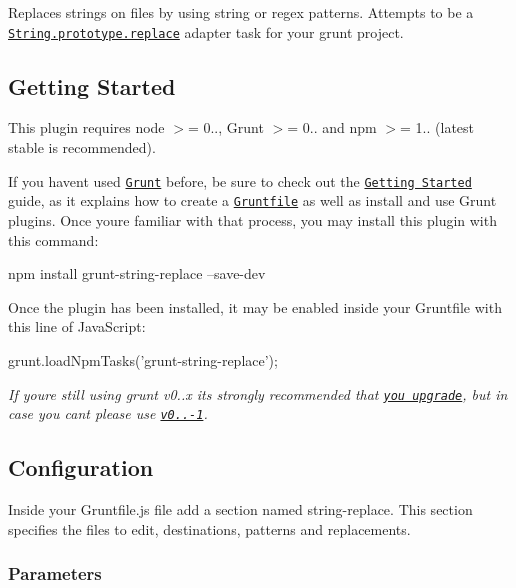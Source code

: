 Replaces strings on files by using string or regex patterns. Attempts to be a \href{http://www.ecma-international.org/ecma-262/5.1/#sec-15.5.4.11}{\tt String.\+prototype.\+replace} adapter task for your grunt project.

\subsection*{Getting Started}

This plugin requires node {\ttfamily $>$= 0..}, Grunt {\ttfamily $>$= 0..} and npm {\ttfamily $>$= 1..} (latest stable is recommended).

If you haven\textquotesingle{}t used \href{http://gruntjs.com/}{\tt Grunt} before, be sure to check out the \href{http://gruntjs.com/getting-started}{\tt Getting Started} guide, as it explains how to create a \href{http://gruntjs.com/sample-gruntfile}{\tt Gruntfile} as well as install and use Grunt plugins. Once you\textquotesingle{}re familiar with that process, you may install this plugin with this command\+:


\begin{DoxyCode}
npm install grunt-string-replace --save-dev
\end{DoxyCode}


Once the plugin has been installed, it may be enabled inside your Gruntfile with this line of Java\+Script\+:


\begin{DoxyCode}
grunt.loadNpmTasks('grunt-string-replace');
\end{DoxyCode}


{\itshape If you\textquotesingle{}re still using grunt v0..\+x it\textquotesingle{}s strongly recommended that \href{http://gruntjs.com/upgrading-from-0.3-to-0.4}{\tt you upgrade}, but in case you can\textquotesingle{}t please use \href{https://github.com/eruizdechavez/grunt-string-replace/tree/0.1.1-1}{\tt v0..-\/1}.}

\subsection*{Configuration}

Inside your {\ttfamily Gruntfile.\+js} file add a section named {\ttfamily string-\/replace}. This section specifies the files to edit, destinations, patterns and replacements.

\subsubsection*{Parameters}

